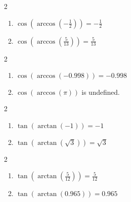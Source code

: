 \documentclass{ximera}
\begin{document}
\begin{multicols}{2}

\begin{enumerate}

\setcounter{enumi}{\value{HW}}

\item $\cos\left(\arccos\left(-\frac{1}{2}\right)\right) = -\frac{1}{2}$
\item $\cos\left(\arccos\left(\frac{5}{13}\right)\right) = \frac{5}{13}$

\setcounter{HW}{\value{enumi}}

\end{enumerate}

\end{multicols}

\begin{multicols}{2}

\begin{enumerate}

\setcounter{enumi}{\value{HW}}

\item $\cos\left(\arccos\left(-0.998\right)\right) = -0.998$
\item $\cos\left(\arccos\left(\pi \right)\right)$ is undefined.

\setcounter{HW}{\value{enumi}}

\end{enumerate}

\end{multicols}

\begin{multicols}{2}

\begin{enumerate}

\setcounter{enumi}{\value{HW}}

\item $\tan\left(\arctan\left(-1\right)\right) = -1$
\item $\tan\left(\arctan\left(\sqrt{3}\right)\right) = \sqrt{3}$

\setcounter{HW}{\value{enumi}}

\end{enumerate}

\end{multicols}

\begin{multicols}{2}

\begin{enumerate}

\setcounter{enumi}{\value{HW}}

\item $\tan\left(\arctan\left(\frac{5}{12}\right)\right) = \frac{5}{12}$
\item $\tan\left(\arctan\left(0.965\right)\right) = 0.965$ 

\setcounter{HW}{\value{enumi}}

\end{enumerate}

\end{multicols}
\end{document}
